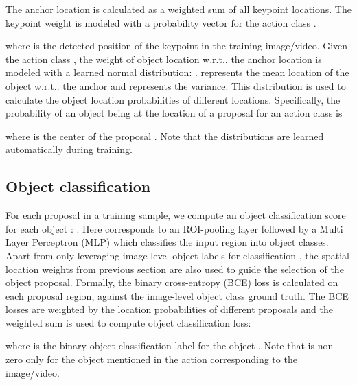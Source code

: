 \documentclass[10pt,twocolumn,letterpaper]{article}
\makeatletter
\DeclareRobustCommand\onedot{\futurelet\@let@token\@onedot}
\def\onedot{\ifx\@let@token.\else.\null\fi\xspace}
\def\wrt{w.r.t\onedot}
\makeatother
\begin{document}
The anchor location  is calculated as a weighted sum of all keypoint locations. The keypoint weight is modeled with a probability vector  for the action class .
\vspace{-0.3\baselineskip}
{\small
}
\vspace{-0.6\baselineskip}

\noindent where  is the detected position of the keypoint  in the training image/video.
Given the action class , the weight of object location \wrt the anchor location is modeled with a learned normal distribution: .  represents the mean location of the object \wrt the anchor and  represents the variance. This distribution is used to calculate the object location probabilities of different locations. Specifically, the probability of an object being at the location of a proposal  for an action class  is 
\vspace{-0.3\baselineskip}
{\small
}
\vspace{-0.5\baselineskip}

\noindent where  is the center of the proposal . Note that the distributions  are learned automatically during training.
\vspace{-0.2\baselineskip}
\subsection{Object classification}
\vspace{-0.2\baselineskip}
For each proposal  in a training sample, we compute an object classification score for each object : . Here  corresponds to an ROI-pooling layer followed by a Multi Layer Perceptron (MLP) which classifies the input region into  object classes. Apart from only leveraging image-level object labels for classification \cite{bilen2016weakly,kantorov2016contextlocnet}, the spatial location weights from previous section are also used to guide the selection of the object proposal. Formally, the binary cross-entropy (BCE) loss is calculated on each proposal region, against the image-level object class ground truth. The BCE losses are weighted by the location probabilities of different proposals and the weighted sum is used to compute object classification loss:
\vspace{-0.3\baselineskip}
{\small
}
\vspace{-0.6\baselineskip}

\noindent where  is the binary object classification label for the object . Note that  is non-zero only for the object mentioned in the action corresponding to the image/video.
\vspace{-0.2\baselineskip}
\end{document}
